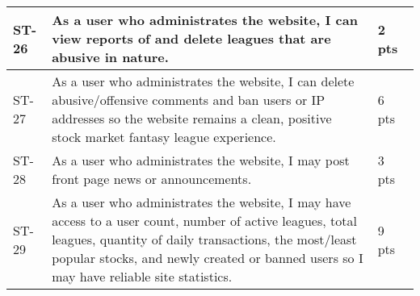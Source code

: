 \begin{longtable}{|p{0.6in}|p{4.6in}|p{0.5in}|}
ST-26&As a user who administrates the website, I can view reports of and delete leagues that are abusive in nature.&2 pts  \\ \hline 
ST-27&As a user who administrates the website, I can delete abusive/offensive comments and ban users or IP addresses so the website remains a clean, positive stock market fantasy league experience.&6 pts  \\ \hline 
ST-28&As a user who administrates the website, I may post front page news or announcements.&3 pts  \\ \hline 
ST-29&As a user who administrates the website, I may have access to a user count, number of active leagues, total leagues, quantity of daily transactions, the most/least popular stocks, and newly created or banned users so I may have reliable site statistics. &9 pts \\ \hline 
\end{longtable}